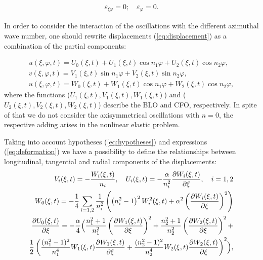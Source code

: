 \begin{eqnarray}\label{eq:hypotheses}
\varepsilon_{\xi \varphi} =0; \quad \varepsilon_{\varphi}=0.
\end{eqnarray}

In order to consider the interaction of the oscillations with the different azimuthal wave number, one should rewrite displacements (\ref{eq:displacement}) as a combination of the partial components:

\begin{eqnarray}\label{eq:displacement2}
u(\xi,\varphi,t)=   U_{0}(\xi,t)+U_{1}(\xi,t)\cos{n_{1}\varphi}+U_{2}(\xi,t) \cos{n_{2} \varphi}, \nonumber \\
v(\xi,\varphi,t)=   V_{1}(\xi,t)\sin{n_{1}\varphi}+V_{2}(\xi,t) \sin{n_{2} \varphi}, \\
u(\xi,\varphi,t)=   W_{0}(\xi,t)+W_{1}(\xi,t)\cos{n_{1}\varphi}+W_{2}(\xi,t) \cos{n_{2} \varphi}, \nonumber
\end{eqnarray}
where the functions ($U_{1}(\xi, t), V_{1}(\xi, t), W_{1}(\xi, t)$) and ($U_{2}(\xi, t), V_{2}(\xi, t), W_{2}(\xi, t)$) describe the BLO and CFO, respectively.
In spite of that we do not consider the axisymmetrical oscillations with $n=0$, the respective adding arises in the nonlinear elastic problem.

Taking into account hypotheses (\ref{eq:hypotheses}) and expressions (\ref{eq:deformation}) we have a possibility to define the relationships between longitudinal, tangential and radial components of the displacements:
\begin{eqnarray}\label{eq:uvexclusion}
V_{i}(\xi ,t) = -\frac{W_{i}(\xi ,t)}{n_{i}}, \quad 
U_{i}(\xi ,t) =  -\frac{\alpha}{n_{i}^2} \frac{\partial W_{i}(\xi ,t)}{\partial \xi}, \quad  i=1,2  \nonumber  \\ 
W_{0}(\xi ,t) = -\frac{1}{4} \sum_{i=1,2} \frac{1}{n_{i}^{2}} \left( \left(n_{i}^{2}-1 \right)^{2} W_{i}^{2}(\xi,t)  + \alpha^{2} \left( \frac{\partial W_{i}(\xi,t)}{\partial \xi} \right)^{2} \right) \nonumber  \\
\frac{\partial U_{0}(\xi,t)}{\partial \xi}= - \frac{\alpha}{4} \Bigl( \frac{n_{1}^{2}
+1 }{n_{1}^{2}} \left( \frac{\partial W_{1}(\xi,t)}{\partial \xi} \right)^{2} + \frac{n_{2}^{2}
+1 }{n_{2}^{2}} \left( \frac{\partial W_{2}(\xi,t)}{\partial \xi} \right)^{2} + \\
\frac{1}{2} \left( \frac{ (n_{1}^{2}-1)^{2}}{n_{1}^{4}} W_{1}(\xi, t)  \frac{\partial W_{1}(\xi,t)}{\partial \xi} + \frac{(n_{2}^{2}-1)^{2}}{n_{2}^{4}} W_{2}(\xi,t) \frac{\partial W_{2}(\xi,t)}{\partial \xi}  \right)^{2} \Bigr), \nonumber
\end{eqnarray}

